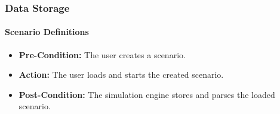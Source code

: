 \documentclass[titlepage]{article}
\newcommand{\testentry}[4]{
    \paragraph{#1}
    \begin{itemize}
        \item \textbf{Pre-Condition:} #2
        \item \textbf{Action:} #3
        \item \textbf{Post-Condition:} #4
    \end{itemize}
}
\begin{document}

\subsubsection{Data Storage%
  \label{data-storage}%
}
    \testentry{Scenario Definitions}{ 
        The user creates a scenario.
    }{
        The user loads and starts the created scenario.
    }{
        The simulation engine stores and parses the loaded scenario.
    }


\appendix
\pagebreak
\end{document}
